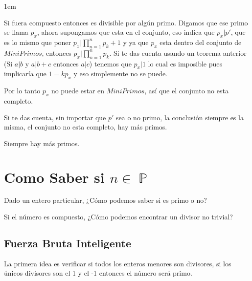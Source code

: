 \documentclass[12pt, fleqn]{report}                             %
\newenvironment{SmallIndentation}[1][0.75em]                    %
    {\begin{adjustwidth}{#1}{}\begin{footnotesize}}                 %
    {\end{footnotesize}\end{adjustwidth}}                           %
\DeclareMathOperator \Naturals  {\mathbb{N}}                     %
\DeclareMathOperator \Primes    {\mathbb{P}}                     %
\begin{document}
\begin{itemize}
\begin{SmallIndentation}[1em]
                    Si fuera compuesto entonces es divisible por algún primo.
                    Digamos que ese primo se llama $p_x$, ahora supongamos que 
                    esta en el conjunto, eso indica que $p_x|p'$, que es lo
                    mismo que poner $p_x|\prod_{n=1}^{n}p_k+1$ y ya que $p_x$ 
                    esta dentro del conjunto de $MiniPrimos$, entonces
                    $p_x|\prod_{n=1}^{n}p_k$. Si te das cuenta usando un teorema anterior
                    (Si $a|b$ y $a|b+c$ entonces $a|c$) tenemos que $p_x|1$ lo cual es
                    imposible pues implicaría que $1 = kp_x$ y eso simplemente no se puede.

                    Por lo tanto $p_x$ no puede estar en $MiniPrimos$, así que el conjunto
                    no esta completo.

                    Si te das cuenta, sin importar que $p'$ sea o no primo, la conclusión
                    siempre es la misma, el conjunto no esta completo, hay más primos.

                    Siempre hay más primos.

                \end{SmallIndentation}

        \end{itemize}





    \clearpage
    \section{Como Saber si $n \in \Primes$}
    
        Dado un entero particular, ¿Cómo podemos saber si es primo o no?

        Si el número es compuesto, ¿Cómo podemos encontrar un divisor no trivial?


        \subsection{Fuerza Bruta Inteligente}

            La primera idea es verificar si todos los enteros menores son
            divisores, si los únicos divisores son el 1 y el -1 entonces
            el número será primo.
\end{document}
